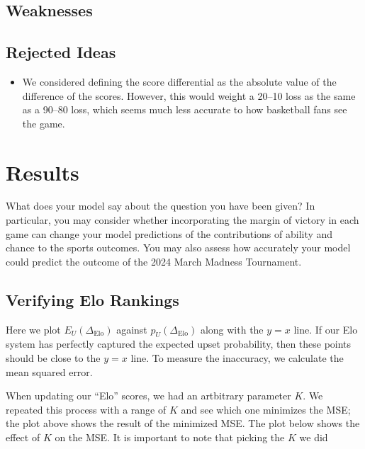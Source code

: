 \documentclass{article}
\begin{document}
\subsection{Weaknesses}

\subsection{Rejected Ideas}
\begin{itemize}
    \item We considered defining the score differential as the absolute value of the difference of the scores. However, this would weight a 20--10 loss as the same as a 90--80 loss, which seems much less accurate to how basketball fans see the game.
\end{itemize}

\section{Results}
What does your model say about the question you have been given?
In particular, you may consider whether
incorporating the margin of victory in each game can change your model predictions of the contributions of
ability and chance to the sports outcomes. You may also assess how accurately your model could predict the
outcome of the 2024 March Madness Tournament.


\subsection{Verifying Elo Rankings}
Here we plot $E_U(\Delta_{\text{Elo}})$ against $\hat{p}_U(\Delta_{\text{Elo}})$ along with the $y=x$ line. If our Elo system has perfectly captured the expected upset probability, then these points should be close to the $y=x$ line. To measure the inaccuracy, we calculate the mean squared error. 

When updating our ``Elo'' scores, we had an artbitrary parameter $K$. We repeated this process with a range of $K$ and see which one minimizes the MSE; the plot above shows the result of the minimized MSE. The plot below shows the effect of $K$ on the MSE. It is important to note that picking the $K$ we did 
\end{document}

